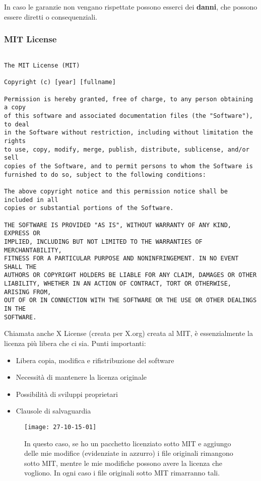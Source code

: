In caso le garanzie non vengano rispettate possono esserci dei \textbf{danni}, che possono essere diretti o consequenziali.

\newpage

\subsubsection{MIT License}

\begin{verbatim}

The MIT License (MIT)

Copyright (c) [year] [fullname]

Permission is hereby granted, free of charge, to any person obtaining a copy
of this software and associated documentation files (the "Software"), to deal
in the Software without restriction, including without limitation the rights
to use, copy, modify, merge, publish, distribute, sublicense, and/or sell
copies of the Software, and to permit persons to whom the Software is
furnished to do so, subject to the following conditions:

The above copyright notice and this permission notice shall be included in all
copies or substantial portions of the Software.

THE SOFTWARE IS PROVIDED "AS IS", WITHOUT WARRANTY OF ANY KIND, EXPRESS OR
IMPLIED, INCLUDING BUT NOT LIMITED TO THE WARRANTIES OF MERCHANTABILITY,
FITNESS FOR A PARTICULAR PURPOSE AND NONINFRINGEMENT. IN NO EVENT SHALL THE
AUTHORS OR COPYRIGHT HOLDERS BE LIABLE FOR ANY CLAIM, DAMAGES OR OTHER
LIABILITY, WHETHER IN AN ACTION OF CONTRACT, TORT OR OTHERWISE, ARISING FROM,
OUT OF OR IN CONNECTION WITH THE SOFTWARE OR THE USE OR OTHER DEALINGS IN THE
SOFTWARE.

\end{verbatim}

Chiamata anche X License (creata per X.org) creata al MIT, \`e essenzialmente la licenza pi\`u libera che ci sia.
Punti importanti:
\begin{itemize}
\item Libera copia, modifica e rifistribuzione del software
\item Necessit\`a di mantenere la licenza originale
\item Possibilit\`a di sviluppi proprietari
\item Clausole di salvaguardia
\end{itemize}

\begin{figure}[h]
  \centering
  \texttt{[image: 27-10-15-01]}
  \caption{In questo caso, se ho un pacchetto licenziato sotto MIT e aggiungo delle mie modifice (evidenziate in azzurro) i file originali rimangono sotto MIT, mentre le mie modifiche possono avere la licenza che vogliono. In ogni caso i file originali sotto MIT rimarranno tali.}
\end{figure}

